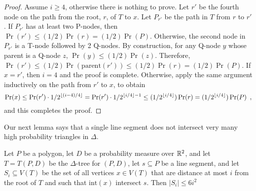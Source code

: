 \documentclass[lotsofwhite]{patmorin}
\newcommand{\interior}{\mathrm{int}}
\newcommand{\prnt}{\mathrm{parent}}
\begin{document}
\begin{proof}
Assume $i\ge 4$, otherwise there is nothing to prove. Let $r'$ be the
fourth node on the path from the root, $r$, of $T$ to $x$.  Let $P_{r'}$ be
the path in $T$ from $r$ to $r'$.  If $P_{r'}$ has at least two
P-nodes, then $\Pr(r')\le (1/2)\Pr(r)=(1/2)\Pr(P)$. Otherwise, the
second node in $P_{r'}$ is a T-node followed by 2 Q-nodes.  By
construction, for any Q-node $y$ whose parent is a Q-node $z$,
$\Pr(y)\le(1/2)\Pr(z)$.  Therefore, $\Pr(r')\le (1/2)\Pr(\prnt(r'))\le
(1/2)\Pr(r) = (1/2)\Pr(P)$.  If $x=r'$, then $i=4$ and the proof is complete.
Otherwise, apply the same argument inductively on the path from $r'$ to $x$, to
obtain
\[
   \Pr(x) \le \Pr(r') \cdot 1/2^{{\left\lfloor (i-4)/4 \right\rfloor}} 
    =  \Pr(r')\cdot 1/2^{{\left\lfloor i/4 \right\rfloor}-1}  
   \le (1/2^{{\left\lfloor i/4 \right\rfloor}})\Pr(r) 
    = (1/2^{{\left\lfloor i/4 \right\rfloor}})\Pr(P)  \enspace ,
\]
and this completes the proof.
%
%
\end{proof}


Our next lemma says that a single line segment does not intersect
very many high probability triangles in $\Delta$.

\begin{lem}
Let $P$ be a polygon, let $D$ be a probability measure over $\mathbb{R}^2$, 
and let $T=T(P,D)$ be the $\Delta$-tree for $(P,D)$, let $s\subseteq P$ be
a line segment, and let $S_i\subseteq V(T)$ be the set of all vertices
$x\in V(T)$ that are distance at most $i$ from the root of $T$ and
such that
$\interior(x)$ intersect $s$.  Then $|S_i|\le 6i^2$
\end{lem}
\end{document}
